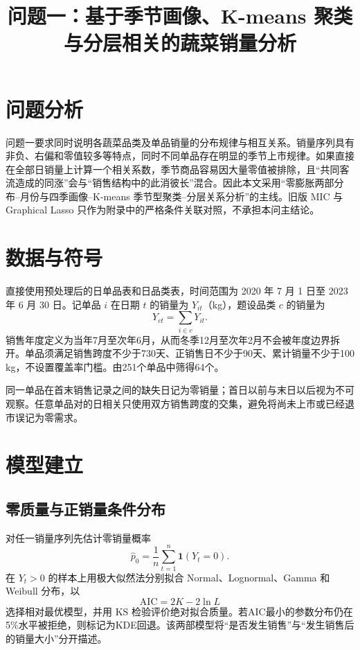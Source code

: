 \documentclass[UTF8,12pt]{ctexart}
\title{问题一：基于季节画像、K-means 聚类与分层相关的蔬菜销量分析}
\author{}
\date{}
\begin{document}
\maketitle

\section{问题分析}

问题一要求同时说明各蔬菜品类及单品销量的分布规律与相互关系。销量序列具有非负、右偏和零值较多等特点，同时不同单品存在明显的季节上市规律。如果直接在全部日销量上计算一个相关系数，季节商品容易因大量零值被排除，且“共同客流造成的同涨”会与“销售结构中的此消彼长”混合。因此本文采用“零膨胀两部分布--月份与四季画像--K-means 季节型聚类--分层关系分析”的主线。旧版 MIC 与 Graphical Lasso 只作为附录中的严格条件关联对照，不承担本问主结论。

\section{数据与符号}

直接使用预处理后的日单品表和日品类表，时间范围为 2020 年 7 月 1 日至 2023 年 6 月 30 日。记单品 $i$ 在日期 $t$ 的销量为 $Y_{it}$（kg），题设品类 $c$ 的销量为
\begin{equation}
Y_{ct}=\sum_{i\in c}Y_{it}.
\end{equation}
销售年度定义为当年7月至次年6月，从而冬季12月至次年2月不会被年度边界拆开。单品须满足销售跨度不少于730天、正销售日不少于90天、累计销量不少于100 kg，不设置覆盖率门槛。由251个单品中筛得64个。

同一单品在首末销售记录之间的缺失日记为零销量；首日以前与末日以后视为不可观察。任意单品对的日相关只使用双方销售跨度的交集，避免将尚未上市或已经退市误记为零需求。

\section{模型建立}

\subsection{零质量与正销量条件分布}

对任一销量序列先估计零销量概率
\begin{equation}
\widehat p_0=\frac{1}{n}\sum_{t=1}^{n}\mathbf 1(Y_t=0).
\end{equation}
在 $Y_t>0$ 的样本上用极大似然法分别拟合 Normal、Lognormal、Gamma 和 Weibull 分布，以
\begin{equation}
\mathrm{AIC}=2K-2\ln L
\end{equation}
选择相对最优模型，并用 KS 检验评价绝对拟合质量。若AIC最小的参数分布仍在5\%水平被拒绝，则标记为KDE回退。该两部模型将“是否发生销售”与“发生销售后的销量大小”分开描述。
\end{document}
